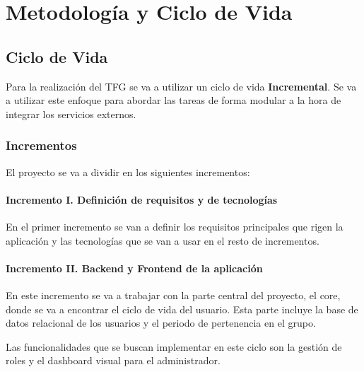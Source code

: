 \chapter{Metodología y Ciclo de Vida}
\section{Ciclo de Vida}

Para la realización del TFG se va a utilizar un ciclo de vida \textbf{Incremental}. Se va a utilizar este enfoque para abordar las tareas de forma modular a la hora de integrar los servicios externos. 


\subsection{Incrementos}
El proyecto se va a dividir en los siguientes incrementos: 

\subsubsection{Incremento I. Definición de requisitos y de tecnologías}

En el primer incremento se van a definir los requisitos principales que rigen la aplicación y las tecnologías que se van a usar en el resto de incrementos.

\subsubsection{Incremento II. Backend y Frontend de la aplicación}

En este incremento se va a trabajar con la parte central del proyecto, el core, donde se va a encontrar el ciclo de vida del usuario. Esta parte incluye la base de datos relacional de los usuarios y el periodo de pertenencia en el grupo.

Las funcionalidades que se buscan implementar en este ciclo son la gestión de roles y el dashboard visual para el administrador. 



